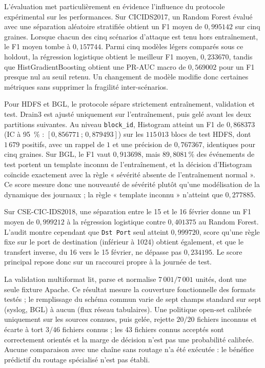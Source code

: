L'évaluation met particulièrement en évidence l'influence du protocole
expérimental sur les performances. Sur CICIDS2017, un Random Forest évalué
avec une séparation aléatoire stratifiée obtient un F1 moyen de
$0{,}995142$ sur cinq graines. Lorsque chacun des cinq scénarios d'attaque
est tenu hors entraînement, le F1 moyen tombe à $0{,}157744$. Parmi cinq
modèles légers comparés sous ce holdout, la régression logistique obtient
le meilleur F1 moyen, $0{,}233670$, tandis que HistGradientBoosting obtient
une PR-AUC macro de $0{,}569002$ pour un F1 presque nul au seuil retenu. Un
changement de modèle modifie donc certaines métriques sans supprimer la
fragilité inter-scénarios.

Pour HDFS et BGL, le protocole sépare strictement entraînement, validation et
test. Drain3 est ajusté uniquement sur l'entraînement, puis gelé avant les
deux partitions suivantes. Au niveau \texttt{block\_id}, Histogram atteint un
F1 de $0{,}868373$ (IC à 95~\% : $[0{,}856771\,;\,0{,}879493]$) sur les
$115\,013$ blocs de test HDFS, dont $1\,679$ positifs, avec un rappel de $1$
et une précision de $0{,}767367$, identiques pour cinq graines. Sur BGL, le F1
vaut $0{,}913698$, mais $89{,}8081\,\%$ des événements de test portent un
template inconnu de l'entraînement, et la décision d'Histogram coïncide
exactement avec la règle « sévérité absente de l'entraînement normal ». Ce
score mesure donc une nouveauté de sévérité plutôt qu'une modélisation de la
dynamique des journaux ; la règle « template inconnu » n'atteint que
$0{,}277885$.

Sur CSE-CIC-IDS2018, une séparation entre le 15 et le 16 février donne un F1
moyen de $0{,}999212$ à la régression logistique contre $0{,}401375$ au
Random Forest. L'audit montre cependant que \texttt{Dst Port} seul atteint
$0{,}999720$, score qu'une règle fixe sur le port de destination (inférieur à
1024) obtient également, et que le transfert inverse, du 16 vers le
15 février, ne dépasse pas $0{,}234195$. Le score principal repose donc sur
un raccourci propre à la journée de test.

La validation multiformat lit, parse et normalise $7\,001/7\,001$ unités, dont
une seule fixture Apache. Ce résultat mesure la couverture fonctionnelle des
formats testés ; le remplissage du schéma commun varie de sept champs standard
sur sept (syslog, BGL) à aucun (flux réseau tabulaires). Une politique
open-set calibrée uniquement sur les sources connues, puis gelée, rejette
$20/20$ fichiers inconnus et écarte à tort $3/46$ fichiers connus ; les
43 fichiers connus acceptés sont correctement orientés et la marge de décision
n'est pas une probabilité calibrée. Aucune comparaison avec une chaîne sans
routage n'a été exécutée : le bénéfice prédictif du routage spécialisé n'est
pas établi.

